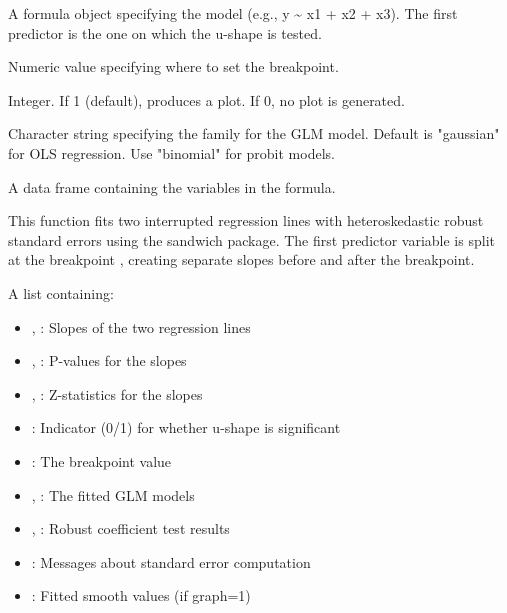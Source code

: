 \documentclass[a4paper]{book}
\begin{document}
\begin{Arguments}
\begin{ldescription}
\item[\code{f}] A formula object specifying the model (e.g., y \textasciitilde{} x1 + x2 + x3).
The first predictor is the one on which the u-shape is tested.

\item[\code{xc}] Numeric value specifying where to set the breakpoint.

\item[\code{graph}] Integer. If 1 (default), produces a plot. If 0, no plot is generated.

\item[\code{family}] Character string specifying the family for the GLM model.
Default is "gaussian" for OLS regression. Use "binomial" for probit models.

\item[\code{data}] A data frame containing the variables in the formula.
\end{ldescription}
\end{Arguments}
%
\begin{Details}
This function fits two interrupted regression lines with heteroskedastic robust
standard errors using the sandwich package. The first predictor variable is split
at the breakpoint , creating separate slopes before and after the breakpoint.
\end{Details}
%
\begin{Value}
A list containing:
\begin{itemize}

\item{} , : Slopes of the two regression lines
\item{} , : P-values for the slopes
\item{} , : Z-statistics for the slopes
\item{} : Indicator (0/1) for whether u-shape is significant
\item{} : The breakpoint value
\item{} , : The fitted GLM models
\item{} , : Robust coefficient test results
\item{} : Messages about standard error computation
\item{} : Fitted smooth values (if graph=1)

\end{itemize}

\end{Value}
\end{document}
